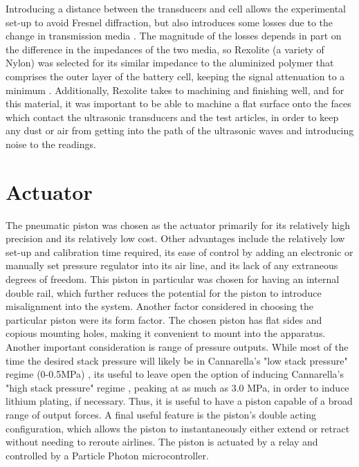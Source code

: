 Introducing a distance between the transducers and cell allows the experimental set-up to avoid Fresnel diffraction, but also introduces some losses due to the change in transmission media . The magnitude of the losses depends in part on the difference in the impedances of the two media, so Rexolite (a variety of Nylon) was selected for its similar impedance to the aluminized polymer that comprises the outer layer of the battery cell, keeping the signal attenuation to a minimum . 
Additionally, Rexolite takes to machining and finishing well, and for this material, it was important to be able to machine a flat surface onto the faces which contact the ultrasonic transducers and the test articles, in order to keep any dust or air from getting into the path of the ultrasonic waves and introducing noise to the readings.
 
\section{Actuator}
The pneumatic piston was chosen as the actuator primarily for its relatively high precision and its relatively low cost. Other advantages include the relatively low set-up and calibration time required, its ease of control by adding an electronic or manually set pressure regulator into its air line, and its lack of any extraneous degrees of freedom. This piston in particular was chosen for having an internal double rail, which further reduces the potential for the piston to introduce misalignment into the system. Another factor considered in choosing the particular piston were its form factor. The chosen piston has flat sides and copious mounting holes, making it convenient to mount into the apparatus. Another important consideration is range of pressure outputs. While most of the time the desired stack pressure will likely be in Cannarella's "low stack pressure" regime (0-0.5MPa) \cite{STACK-STRESS}, its useful to leave open the option of inducing Cannarella's "high stack pressure" regime \cite{STACK-STRESS}, peaking at as much as 3.0 MPa, in order to induce lithium plating, if necessary.  Thus, it is useful to have a piston capable of a broad range of output forces. A final useful feature is the piston's double acting configuration, which allows the piston to instantaneously either extend or retract without needing to reroute airlines. The piston is actuated by a relay and controlled by a Particle Photon microcontroller.
    